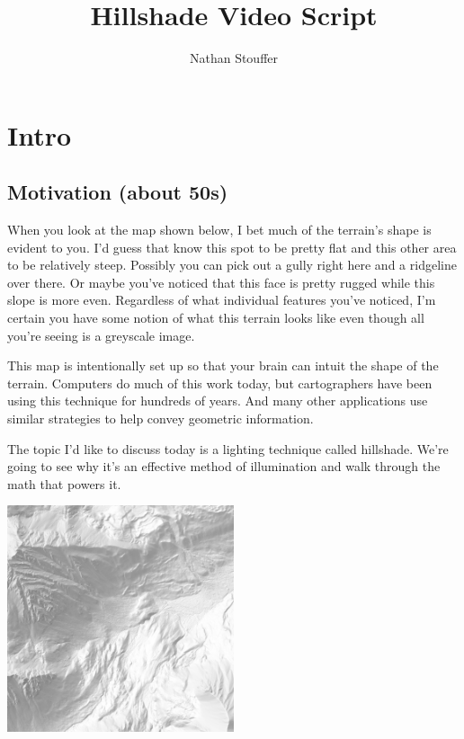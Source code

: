 \documentclass{article}
\newcommand\animation[1]{\textcolor{blue}{ANIMATION: #1}}
\begin{document}
	
\title{Hillshade Video Script}
\author{Nathan Stouffer}
\date{}
\maketitle

\section{Intro}

\subsection{Motivation (about 50s)}

When you look at the map shown below, I bet much of the terrain's shape is evident to you.
I'd guess that know this spot to be pretty flat and this other area to be relatively steep.
Possibly you can pick out a gully right here and a ridgeline over there.
Or maybe you've noticed that this face is pretty rugged while this slope is more even.
Regardless of what individual features you've noticed, I'm certain you have some notion of what this terrain looks like even though all you're seeing is a greyscale image.


This map is intentionally set up so that your brain can intuit the shape of the terrain.
Computers do much of this work today, but cartographers have been using this technique for hundreds of years.
And many other applications use similar strategies to help convey geometric information.

The topic I'd like to discuss today is a lighting technique called hillshade.
We're going to see why it's an effective method of illumination and walk through the math that powers it.

\begin{center}
	\includegraphics[width=0.5\textwidth,frame]{assets/hillshade-example.png}
\end{center}
\end{document}
